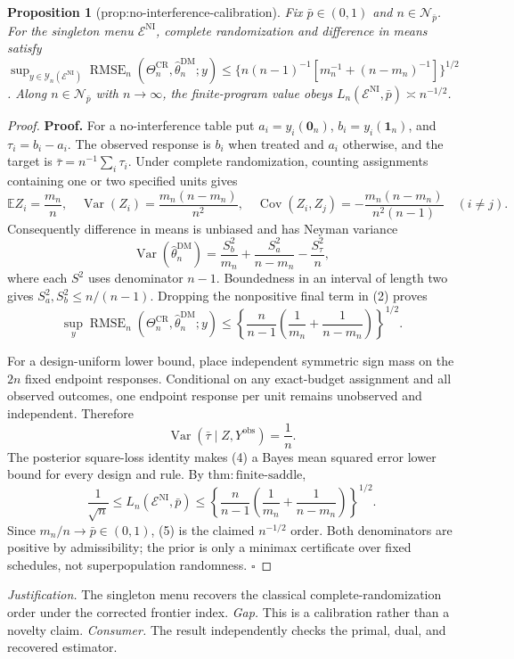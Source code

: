 \documentclass{article}
\newtheorem{proposition}{Proposition}
\begin{document}
\begin{proposition}[prop:no-interference-calibration]\label{prop:no-interference-calibration}
Fix \(\bar p\in(0,1)\) and \(n\in\mathcal N_{\bar p}\). For the singleton menu \(\mathcal E^{\mathrm{NI}}\), complete randomization and difference in means satisfy \(\sup_{y\in\mathcal Y_n(\mathcal E^{\mathrm{NI}})}\operatorname{RMSE}_n(\Theta_n^{\mathrm{CR}},\widehat\theta_n^{\mathrm{DM}};y)\le\{n(n-1)^{-1}[m_n^{-1}+(n-m_n)^{-1}]\}^{1/2}\). Along \(n\in\mathcal N_{\bar p}\) with \(n\to\infty\), the finite-program value obeys \(L_n(\mathcal E^{\mathrm{NI}},\bar p)\asymp n^{-1/2}\).
\end{proposition}
\begin{proof}
\textbf{Proof.}
For a no-interference table put \(a_i=y_i(\mathbf 0_n)\), \(b_i=y_i(\mathbf 1_n)\), and \(\tau_i=b_i-a_i\). The observed response is \(b_i\) when treated and \(a_i\) otherwise, and the target is \(\bar\tau=n^{-1}\sum_i\tau_i\). Under complete randomization, counting assignments containing one or two specified units gives
\[
 \mathbb EZ_i=\frac{m_n}{n},\quad
 \operatorname{Var}(Z_i)=\frac{m_n(n-m_n)}{n^2},\quad
 \operatorname{Cov}(Z_i,Z_j)=-\frac{m_n(n-m_n)}{n^2(n-1)}\quad(i\ne j). \tag{1}
\]
Consequently difference in means is unbiased and has Neyman variance
\[
 \operatorname{Var}(\widehat\theta_n^{\mathrm{DM}})
 =\frac{S_b^2}{m_n}+\frac{S_a^2}{n-m_n}-\frac{S_\tau^2}{n}, \tag{2}
\]
where each \(S^2\) uses denominator \(n-1\). Boundedness in an interval of length two gives \(S_a^2,S_b^2\le n/(n-1)\). Dropping the nonpositive final term in (2) proves
\[
 \sup_y\operatorname{RMSE}_n(\Theta_n^{\mathrm{CR}},\widehat\theta_n^{\mathrm{DM}};y)
 \le\left\{\frac{n}{n-1}
 \left(\frac1{m_n}+\frac1{n-m_n}\right)\right\}^{1/2}. \tag{3}
\]

For a design-uniform lower bound, place independent symmetric sign mass on the \(2n\) fixed endpoint responses. Conditional on any exact-budget assignment and all observed outcomes, one endpoint response per unit remains unobserved and independent. Therefore
\[
 \operatorname{Var}(\bar\tau\mid Z,Y^{\mathrm{obs}})=\frac1n. \tag{4}
\]
The posterior square-loss identity makes (4) a Bayes mean squared error lower bound for every design and rule. By \(\mathrm{thm{:}finite\text{-}saddle}\),
\[
 \frac1{\sqrt n}\le L_n(\mathcal E^{\mathrm{NI}},\bar p)
 \le\left\{\frac{n}{n-1}
 \left(\frac1{m_n}+\frac1{n-m_n}\right)\right\}^{1/2}. \tag{5}
\]
Since \(m_n/n\to\bar p\in(0,1)\), (5) is the claimed \(n^{-1/2}\) order. Both denominators are positive by admissibility; the prior is only a minimax certificate over fixed schedules, not superpopulation randomness. \(\square\)
\end{proof}
\par\smallskip\noindent \textit{Justification.} The singleton menu recovers the classical complete-randomization order under the corrected frontier index. \textit{Gap.} This is a calibration rather than a novelty claim. \textit{Consumer.} The result independently checks the primal, dual, and recovered estimator.
\end{document}
